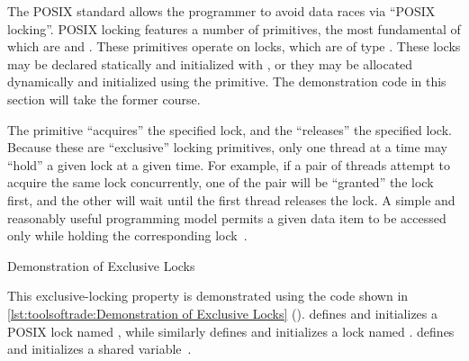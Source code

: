 The POSIX standard allows the programmer to avoid data races via
``POSIX locking''.
POSIX locking features a number of primitives, the most fundamental
of which are  and .
These primitives operate on locks, which are of type .
These locks may be declared statically and initialized with
, or they may be allocated dynamically
and initialized using the  primitive.
The demonstration code in this section will take the former course.

The  primitive ``acquires'' the specified lock,
and the  ``releases'' the specified lock.
Because these are ``exclusive'' locking primitives,
only one thread at a time may ``hold'' a given lock at a given time.
For example, if a pair of threads attempt to acquire the same lock
concurrently, one of the pair will be ``granted'' the lock first, and
the other will wait until the first thread releases the lock.
A simple and reasonably useful programming model permits a given data item
to be accessed only while holding the corresponding
lock~\cite{Hoare74}.

\QuickQuizEnd

\begin{listing}
\caption{Demonstration of Exclusive Locks}
\label{lst:toolsoftrade:Demonstration of Exclusive Locks}
\end{listing}

\begin{fcvref}
This exclusive-locking property is demonstrated using the code shown in
\cref{lst:toolsoftrade:Demonstration of Exclusive Locks}
().
 defines and initializes a POSIX lock named , while
 similarly defines and initializes a lock named .
 defines and initializes a shared variable~.
\end{fcvref}

